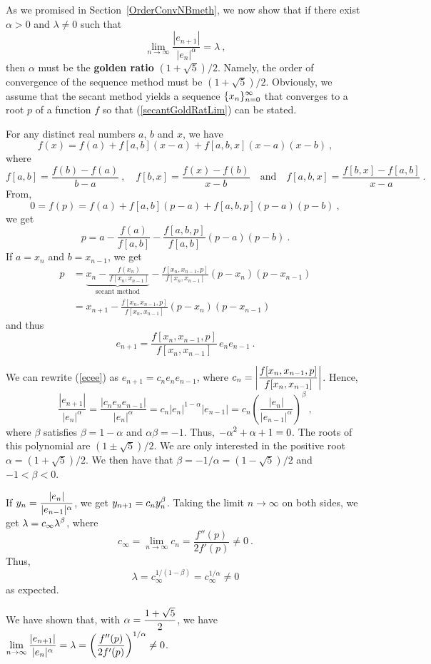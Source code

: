 \begin{rmk}
As we promised in Section~\ref{OrderConvNBmeth}, we now show that
if there exist $\alpha>0$ and $\lambda \neq 0$ such that
\begin{equation} \label{secantGoldRatLim}
\lim_{n\rightarrow \infty} \frac{|e_{n+1}|}{|e_n|^\alpha} = \lambda \ ,
\end{equation}
then $\alpha$ must be the {\bfseries golden ratio}
$(1+\sqrt{5})/2$.  Namely, the order of convergence of the sequence method
must be $(1+\sqrt{5})/2$.  Obviously, we assume that the secant method
yields a sequence $\displaystyle \{ x_n\}_{n=0}^\infty$ that converges
to a root $p$ of a function $f$ so that (\ref{secantGoldRatLim}) can
be stated.

For any distinct real numbers $a$, $b$ and $x$, we have
\[
f(x) = f(a) + f[a,b] (x-a) + f[a,b,x](x-a)(x-b) \ ,
\]
where
\[
f[a,b] = \frac{f(b)-f(a)}{b-a} \ , \quad
f[b,x] = \frac{f(x)-f(b)}{x-b}
\quad \text{and} \quad
f[a,b,x] = \frac{f[b,x] - f[a,b]}{x-a} \ .
\]
From,
\[
0 = f(p) = f(a) + f[a,b] (p-a) + f[a,b,p](p-a)(p-b) \ ,
\]
we get
\[
p = a - \frac{f(a)}{f[a,b]} - \frac{f[a,b,p]}{f[a,b]}(p-a)(p-b) \ .
\]
If $a=x_n$ and $b=x_{n-1}$, we get
\begin{align*}
p &= \underbrace{x_n - \frac{f(x_n)}{f[x_n,x_{n-1}]}}_{\text{secant method}}
 - \frac{f[x_n,x_{n-1},p]}{f[x_n,x_{n-1}]}(p-x_n)(p-x_{n-1}) \\
&= x_{n+1} - \frac{f[x_n,x_{n-1},p]}{f[x_n,x_{n-1}]}(p-x_n)(p-x_{n-1})
\end{align*}
and thus
\begin{equation} \label{ecee}
e_{n+1} = \frac{f[x_n,x_{n-1},p]}{f[x_n,x_{n-1}]} \, e_n e_{n-1} \ .
\end{equation}

We can rewrite (\ref{ecee}) as $e_{n+1} = c_n e_n e_{n-1}$, where
$\displaystyle c_n = \left| \frac{f[x_n,x_{n-1},p]}{f[x_n,x_{n-1}]} \right|$.
Hence,
\[
\frac{|e_{n+1}|}{|e_n|^\alpha} 
= \frac{|c_n e_n e_{n-1}|}{|e_n|^\alpha}
= c_n |e_n|^{1-\alpha} |e_{n-1}|
= c_n \left( \frac{|e_n|}{|e_{n-1}|^\alpha} \right)^\beta \ ,
\]
where $\beta$ satisfies $\beta=1-\alpha$ and $\alpha\beta=-1$.
Thus, $\displaystyle -\alpha^2 + \alpha + 1 = 0$.  The roots of this
polynomial are $(1\pm \sqrt{5})/2$.  We are only interested in the positive root
$\alpha = (1 + \sqrt{5})/2$.   We then have that
$\beta = -1/\alpha = (1 -\sqrt{5})/2$
and $-1 < \beta <0$.

If $\displaystyle y_n = \frac{|e_n|}{|e_{n-1}|^\alpha}$, we get
$\displaystyle y_{n+1} = c_n y_n^\beta$.  Taking the limit
$n\rightarrow \infty$ on
both sides, we get $\displaystyle \lambda = c_\infty \lambda^\beta$, where
\[
c_\infty = \lim_{n\rightarrow \infty} c_n = \frac{f''(p)}{2f'(p)} \neq 0 \ .
\]
Thus,
\[
  \lambda = c_\infty^{1/(1-\beta)} = c_\infty^{1/\alpha} \neq 0
\]
as expected.

We have shown that, with
$\displaystyle \alpha = \frac{1 + \sqrt{5}}{2}$, we have
$\displaystyle
\lim_{n\rightarrow \infty} \frac{|e_{n+1}|}{|e_n|^\alpha} =
\lambda =  \left(\frac{f''(p)}{2f'(p)}\right)^{1/\alpha} \neq 0$.
\label{bisOrderGold}
\end{rmk}

